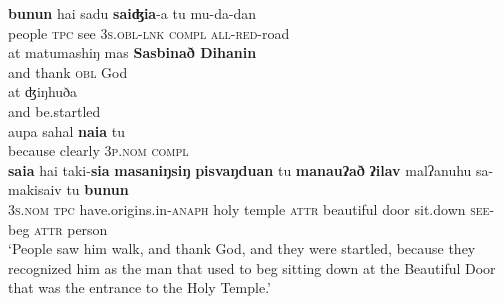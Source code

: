 \documentclass[output=paper
,modfonts
,nonflat]{langsci/langscibook}
\begin{document}
\largerpage[2]
\begin{exe}
	\label{tx3-10}
	\begin{xlist}
		\ex\label{tx3-10a}
		\gll \textbf{bunun}  hai  sadu  \textbf{saiʤia}{}-a  tu  mu-da-dan\\
		people  \textsc{tpc}  see  \textsc{3s.obl}{}-\textsc{lnk}  \textsc{compl}  \textsc{all}{}-\textsc{red}{}-road\\
		\ex\label{tx3-10b}
		\gll at  matumashiŋ  mas  \textbf{Sasbinað Dihanin}\\
		and  thank  \textsc{obl}  God\\
		\ex\label{tx3-10c}
		\gll at  ʤiŋhuða\\
		and  be.startled\\
		\ex\label{tx3-10d}
		\gll aupa  sahal  \textbf{naia}  tu\\
		because  clearly  \textsc{3p.nom}   \textsc{compl}\\
		\ex\label{tx3-10e}
		\gll \textbf{saia}  hai  taki-\textbf{sia}  \textbf{masaniŋsiŋ} \textbf{pisvaŋduan}  tu  \textbf{manauʔað} \textbf{ʔilav}  malʔanuhu  sa-makisaiv  tu  \textbf{bunun}\\
		\textsc{3s.nom}  \textsc{tpc}  have.origins.in-\textsc{anaph}  holy  temple  \textsc{attr}  beautiful  door  sit.down  \textsc{see}{}-beg  \textsc{attr}  person\\
		\glt `People saw him walk, and thank God, and they were startled, because they recognized him as the man that used to beg sitting down at the Beautiful Door that was the entrance to the Holy Temple.’
	\end{xlist}

\end{exe}
\end{document}
